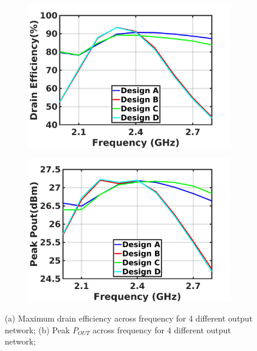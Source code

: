 \documentclass[conference]{IEEEtran}
\begin{document}
\begin{figure}[!t]
\captionsetup{font=footnotesize}
\centering
\begin{subfigure}{0.24\textwidth}
\centering
\includegraphics[width=1\textwidth]{Images/Output_Network_Comp/Comp_DE.jpg}
\caption{}
\label{fig:Comp_DE}
\end{subfigure}
\begin{subfigure}{0.24\textwidth}
\includegraphics[width=1\textwidth]{Images/Output_Network_Comp/Comp_Pout.jpg}
\caption{}
\label{fig:Comp_Pout}
\end{subfigure}
\caption{(a) Maximum drain efficiency across frequency for 4 different output network; (b) Peak $P_{OUT}$ across frequency for 4 different output network;}
\label{fig:Comp_Pout_DE}
\vspace{-0.25in}
\end{figure}
\end{document}

